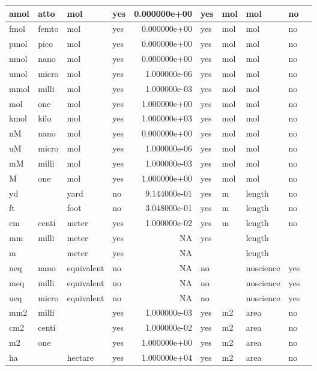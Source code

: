 \begin{tabular}{l|l|l|l|r|l|l|l|l|l}
\hline
amol & atto & mol & yes & 0.000000e+00 & yes & mol & mol & no & \\
\hline
fmol & femto & mol & yes & 0.000000e+00 & yes & mol & mol & no & \\
\hline
pmol & pico & mol & yes & 0.000000e+00 & yes & mol & mol & no & \\
\hline
nmol & nano & mol & yes & 0.000000e+00 & yes & mol & mol & no & \\
\hline
umol & micro & mol & yes & 1.000000e-06 & yes & mol & mol & no & \\
\hline
mmol & milli & mol & yes & 1.000000e-03 & yes & mol & mol & no & \\
\hline
mol & one & mol & yes & 1.000000e+00 & yes & mol & mol & no & \\
\hline
kmol & kilo & mol & yes & 1.000000e+03 & yes & mol & mol & no & \\
\hline
nM & nano & mol & yes & 0.000000e+00 & yes & mol & mol & no & \\
\hline
uM & micro & mol & yes & 1.000000e-06 & yes & mol & mol & no & \\
\hline
mM & milli & mol & yes & 1.000000e-03 & yes & mol & mol & no & \\
\hline
M & one & mol & yes & 1.000000e+00 & yes & mol & mol & no & \\
\hline
yd &  & yard & no & 9.144000e-01 & yes & m & length & no & \\
\hline
ft &  & foot & no & 3.048000e-01 & yes & m & length & no & \\
\hline
cm & centi & meter & yes & 1.000000e-02 & yes & m & length & no & \\
\hline
mm & milli & meter & yes & NA & yes &  & length &  & \\
\hline
m &  & meter & yes & NA &  &  & length &  & \\
\hline
neq & nano & equivalent & no & NA & no &  & noscience & yes & \\
\hline
meq & milli & equivalent & no & NA & no &  & noscience & yes & \\
\hline
ueq & micro & equivalent & no & NA & no &  & noscience & yes & \\
\hline
mm2 & milli &  & yes & 1.000000e-03 & yes & m2 & area & no & \\
\hline
cm2 & centi &  & yes & 1.000000e-02 & yes & m2 & area & no & \\
\hline
m2 & one &  & yes & 1.000000e+00 & yes & m2 & area & no & \\
\hline
ha &  & hectare & yes & 1.000000e+04 & yes & m2 & area & no & \\

\end{tabular}
